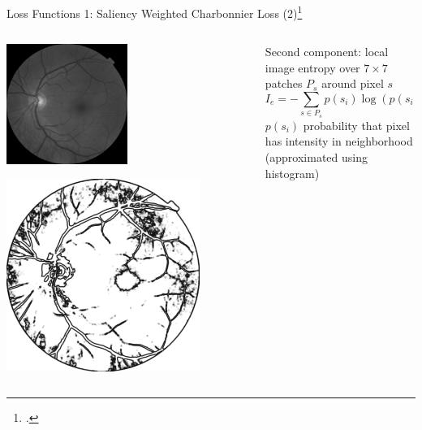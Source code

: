 \documentclass{beamer}
\begin{document}
\begin{frame}{Loss Functions 1: Saliency Weighted Charbonnier Loss (2)\footcite{SaliencyGAN}}
\begin{columns}
  \begin{column}{0.5\linewidth}
      \centering
      \includegraphics[width=0.5\textwidth]{saliency_gt}

      \includegraphics[width=0.8\textwidth]{saliency_entropy}
  \end{column}
  \begin{column}{0.6\linewidth}
Second component: local image entropy over $7 \times 7$ patches $P_s$ around pixel $s$
\begin{equation}
  \label{eq:entr}
  I_e = - \sum_{s \in P_s} p(s_i) \log(p(s_i)),
\end{equation}
$p(s_i)$ probability that pixel has intensity in neighborhood (approximated using histogram)

\end{column} 
\end{columns}
\end{frame}
\end{document}
